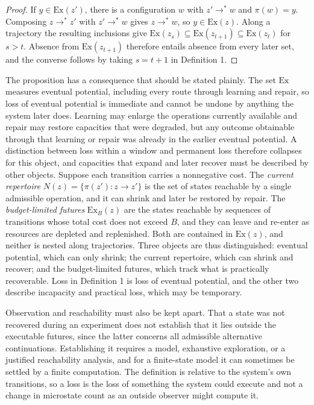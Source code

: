 \documentclass[11pt]{article}
\theoremstyle{definition}
\theoremstyle{plain}
\theoremstyle{remark}
\begin{document}
\begin{proof}
If $y \in \mathrm{Ex}(z')$, there is a configuration $w$ with $z' \to^{*} w$ and $\pi(w) = y$. Composing $z \to^{*} z'$ with $z' \to^{*} w$ gives $z \to^{*} w$, so $y \in \mathrm{Ex}(z)$. Along a trajectory the resulting inclusions give $\mathrm{Ex}(z_s) \subseteq \mathrm{Ex}(z_{t+1}) \subseteq \mathrm{Ex}(z_t)$ for $s > t$. Absence from $\mathrm{Ex}(z_{t+1})$ therefore entails absence from every later set, and the converse follows by taking $s = t+1$ in Definition 1.
\end{proof}

The proposition has a consequence that should be stated plainly. The set $\mathrm{Ex}$ measures eventual potential, including every route through learning and repair, so loss of eventual potential is immediate and cannot be undone by anything the system later does. Learning may enlarge the operations currently available and repair may restore capacities that were degraded, but any outcome obtainable through that learning or repair was already in the earlier eventual potential. A distinction between loss within a window and permanent loss therefore collapses for this object, and capacities that expand and later recover must be described by other objects. Suppose each transition carries a nonnegative cost. The \emph{current repertoire} $N(z) = \{\pi(z') : z \to z'\}$ is the set of states reachable by a single admissible operation, and it can shrink and later be restored by repair. The \emph{budget-limited futures} $\mathrm{Ex}_B(z)$ are the states reachable by sequences of transitions whose total cost does not exceed $B$, and they can leave and re-enter as resources are depleted and replenished. Both are contained in $\mathrm{Ex}(z)$, and neither is nested along trajectories. Three objects are thus distinguished: eventual potential, which can only shrink; the current repertoire, which can shrink and recover; and the budget-limited futures, which track what is practically recoverable. Loss in Definition 1 is loss of eventual potential, and the other two describe incapacity and practical loss, which may be temporary.

Observation and reachability must also be kept apart. That a state was not recovered during an experiment does not establish that it lies outside the executable futures, since the latter concerns all admissible alternative continuations. Establishing it requires a model, exhaustive exploration, or a justified reachability analysis, and for a finite-state model it can sometimes be settled by a finite computation. The definition is relative to the system's own transitions, so a loss is the loss of something the system could execute and not a change in microstate count as an outside observer might compute it.
\end{document}

